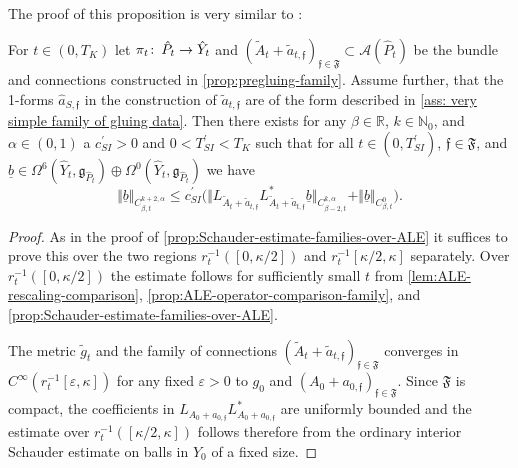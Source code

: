 \documentclass[11pt,a4paper]{scrartcl}
\newcommand{\col}{\colon \thinspace}
\newcommand{\VertWCt}[3]{\Vert_{C^{{#1}}_{{#2},t}{#3}}}
\newcommand{\VertWHt}[3]{\Vert_{C^{{#1},\alpha}_{{#2},t}{#3}}}
\numberwithin{equation}{section}
\theoremstyle{plain}
\theoremstyle{definition}
\theoremstyle{remark}
\begin{document}
The proof of this proposition is very similar to \cite[Proposition~8.1]{Walpuski-InstantonsKummer}:

\begin{proposition}
For $t\in (0,T_K)$ let $\pi_t \col \hat{P}_t \to \hat{Y}_t$ and $(\tilde{A}_t+\tilde{a}_{t,\mathfrak{f}})_{\mathfrak{f}\in\mathfrak{F}} \subset \mathcal{A}(\hat{P}_t)$ be the bundle and connections constructed in \autoref{prop:pregluing-family}. Assume further, that the 1-forms $\hat{a}_{S,\mathfrak{f}}$ in the construction of $\tilde{a}_{t,\mathfrak{f}}$ are of the form described in \autoref{ass: very simple family of gluing data}. Then there exists for any $\beta \in \mathbb{R}$, $k\in \mathbb{N}_0$, and $\alpha\in(0,1)$ a $c_{SI}^\prime>0$ and $0<T_{SI}^\prime<T_K$ such that for all $t \in (0,T^\prime_{SI})$, $\mathfrak{f} \in \mathfrak{F}$, and $\underline{b} \in \Omega^6(\hat{Y}_t,\mathfrak{g}_{\hat{P}_t}) \oplus \Omega^0(\hat{Y}_t,\mathfrak{g}_{\hat{P}_t})$ we have \[ \Vert \underline{b} \VertWHt{k+2}{\beta}{} \leq c_{SI}^\prime \big(\Vert L_{\tilde{A}_t+\tilde{a}_{t,\mathfrak{f}}}L_{\tilde{A}_t+\tilde{a}_{t,\mathfrak{f}}}^* \underline{b} \VertWHt{k}{\beta-2}{} + \Vert \underline{b} \VertWCt{0}{\beta}{} \big). \]
\end{proposition}
\begin{proof}
As in the proof of \autoref{prop:Schauder-estimate-families-over-ALE} it suffices to prove this over the two regions $r_t^{-1}([0,\kappa/2])$ and $r_t^{-1}[\kappa/2,\kappa]$ separately. Over $r_t^{-1}([0,\kappa/2])$ the estimate follows for sufficiently small $t$ from \autoref{lem:ALE-rescaling-comparison}, \autoref{prop:ALE-operator-comparison-family}, and \autoref{prop:Schauder-estimate-families-over-ALE}. 

The metric $\tilde{g}_t$ and the family of connections $(\tilde{A}_t+\tilde{a}_{t,\mathfrak{f}})_{\mathfrak{f} \in \mathfrak{F}}$ converges in $C^{\infty}(r_t^{-1}[\varepsilon,\kappa])$ for any fixed $\varepsilon>0$ to $g_0$ and $(A_0 + a_{0,\mathfrak{f}})_{\mathfrak{f} \in \mathfrak{F}}$. Since $\mathfrak{F}$ is compact, the coefficients in $L_{A_0+a_{0,\mathfrak{f}}}L_{A_0+a_{0,\mathfrak{f}}}^*$ are uniformly bounded and the estimate over $r_t^{-1}([\kappa/2,\kappa])$ follows therefore from the ordinary interior Schauder estimate on balls in $Y_0$ of a fixed size.
\end{proof}
\end{document}
